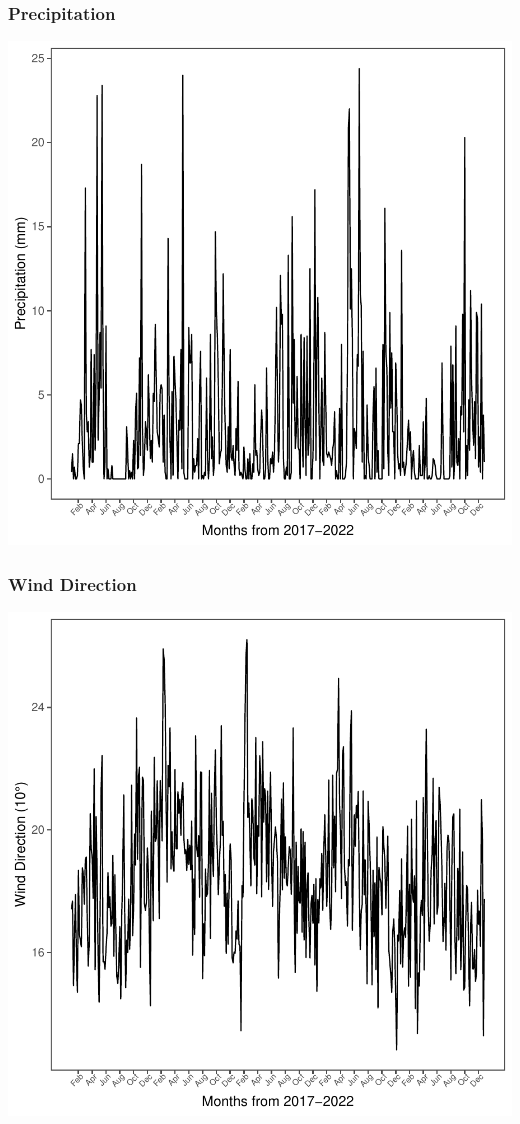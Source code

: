 \documentclass[11pt, a4paper]{article}
\begin{document}
\subsubsection{Precipitation}

\includegraphics{variableinvestigation-037}


\subsubsection{Wind Direction}

\includegraphics{variableinvestigation-038}
\end{document}
